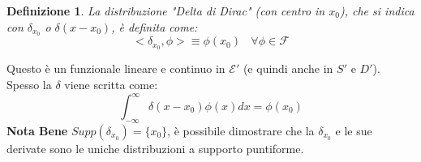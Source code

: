 \documentclass[twoside]{article}
\newtheorem{definition}{Definizione}[section]
\begin{document}
\begin{definition}
La distribuzione "Delta di Dirac" (con centro in $x_0$), che si indica con $\delta_{x_{0}}$ o $\delta(x-x_0)$, è definita come:
\begin{equation}
    <\delta_{x_{0}},\phi>\equiv \phi(x_{0}) \ \ \ \ \forall \phi \in \mathcal{F}
\end{equation}
\end{definition}
Questo è un funzionale lineare e continuo in $\mathcal{E}'$ (e quindi anche in $S'$ e $D'$).\\
Spesso la $\delta$ viene scritta come:
\begin{equation}
    \int_{-\infty}^{\infty} \delta(x-x_0)\phi(x) dx = \phi(x_0)
\end{equation}
\textbf{Nota Bene} $Supp(\delta_{x_{0}})=\{x_0\}$, è possibile dimostrare che la $\delta_{x_{0}}$ e le sue derivate sono le uniche distribuzioni a supporto puntiforme. 
\end{document}
